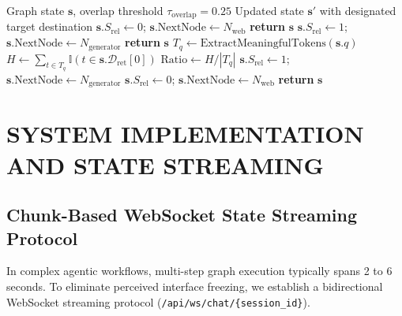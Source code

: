 \documentclass[conference]{IEEEtran}
\begin{document}
\begin{algorithm}[htbp]
\caption{Two-Phase Context Evaluation and Dynamic Fallback}
\label{alg:grader}
\begin{algorithmic}[1]
\Require Graph state $\mathbf{s}$, overlap threshold $\tau_{\text{overlap}} = 0.25$
\Ensure Updated state $\mathbf{s}'$ with designated target destination
        \State $\mathbf{s}.S_{\text{rel}} \leftarrow 0$; $\mathbf{s}.\text{NextNode} \leftarrow N_{\text{web}}$
        \State \textbf{return} $\mathbf{s}$
    \EndIf
        \State $\mathbf{s}.S_{\text{rel}} \leftarrow 1$; $\mathbf{s}.\text{NextNode} \leftarrow N_{\text{generator}}$
        \State \textbf{return} $\mathbf{s}$ 
    \EndIf
    \State $T_q \leftarrow \text{ExtractMeaningfulTokens}(\mathbf{s}.q)$
    \State $H \leftarrow \sum_{t \in T_q} \mathbb{I}(t \in \mathbf{s}.\mathcal{D}_{\text{ret}}[0])$ 
    \State $\text{Ratio} \leftarrow H / |T_q|$
        \State $\mathbf{s}.S_{\text{rel}} \leftarrow 1$; $\mathbf{s}.\text{NextNode} \leftarrow N_{\text{generator}}$
    \Else
        \State $\mathbf{s}.S_{\text{rel}} \leftarrow 0$; $\mathbf{s}.\text{NextNode} \leftarrow N_{\text{web}}$
    \EndIf
    \State \textbf{return} $\mathbf{s}$
\EndFunction
\end{algorithmic}
\end{algorithm}

\section{SYSTEM IMPLEMENTATION AND STATE STREAMING}

\subsection{Chunk-Based WebSocket State Streaming Protocol}
In complex agentic workflows, multi-step graph execution typically spans 2 to 6 seconds. To eliminate perceived interface freezing, we establish a bidirectional WebSocket streaming protocol (\texttt{/api/ws/chat/\{session\_id\}}).
\end{document}
